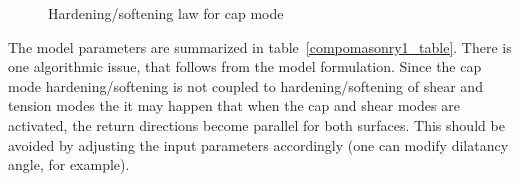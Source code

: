 \documentclass[epsf,a4paper]{article}
\begin{document}
\begin{figure}
  \centerline{}
\caption{Hardening/softening law for cap mode}
\label{hs3fig}
\end{figure}

The model parameters are summarized in table~\ref{compomasonry1_table}.
There is one algorithmic issue, that follows from the model
formulation. Since the cap mode hardening/softening is not coupled to
hardening/softening of shear and tension modes the it may happen that 
when the cap and shear modes are activated, the return directions
become parallel for both surfaces. This should be avoided by adjusting
the input parameters accordingly (one can modify dilatancy angle, for example). 
\end{document}

